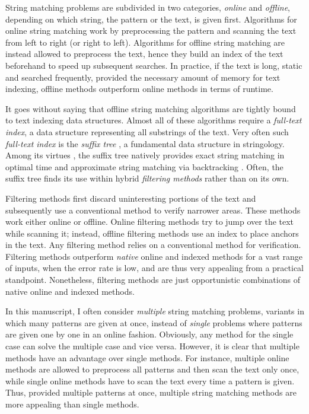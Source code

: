 String matching problems are subdivided in two categories, \emph{online} and \emph{offline}, depending on which string, the pattern or the text, is given first.
Algorithms for online string matching work by preprocessing the pattern and scanning the text from left to right (or right to left).
Algorithms for offline string matching are instead allowed to preprocess the text,
hence they build an index of the text beforehand to speed up subsequent searches.
In practice, if the text is long, static and searched frequently, provided the necessary amount of memory for text indexing, offline methods outperform online methods in terms of runtime.

It goes without saying that offline string matching algorithms are tightly bound to text indexing data structures.
Almost all of these algorithms require a \emph{full-text index}, \ie a data structure representing all substrings of the text.
Very often such \emph{full-text index} is the \emph{suffix tree} \citep{Weiner1973}, a fundamental data structure in stringology.
Among its virtues \citep{Apostolico1985}, the suffix tree natively provides exact string matching in optimal time and approximate string matching via backtracking \citep{Ukkonen1993}.
Often, the suffix tree finds its use within hybrid \emph{filtering methods} rather than on its own.

Filtering methods first discard uninteresting portions of the text and subsequently use a conventional method to verify narrower areas.
These methods work either online or offline.
Online filtering methods try to jump over the text while scanning it; instead, offline filtering methods use an index to place anchors in the text.
Any filtering method relies on a conventional method for verification.
Filtering methods outperform \emph{native} online and indexed methods for a vast range of inputs, \ie when the error rate is low, and are thus very appealing from a practical standpoint.
Nonetheless, filtering methods are just opportunistic combinations of native online and indexed methods.

In this manuscript, I often consider \emph{multiple} string matching problems, \ie variants in which many patterns are given at once, instead of \emph{single} problems where patterns are given one by one in an online fashion.
Obviously, any method for the single case can solve the multiple case and vice versa.
However, it is clear that multiple methods have an advantage over single methods.
For instance, multiple online methods are allowed to preprocess all patterns and then scan the text only once, while single online methods have to scan the text every time a pattern is given.
Thus, provided multiple patterns at once, multiple string matching methods are more appealing than single methods.


